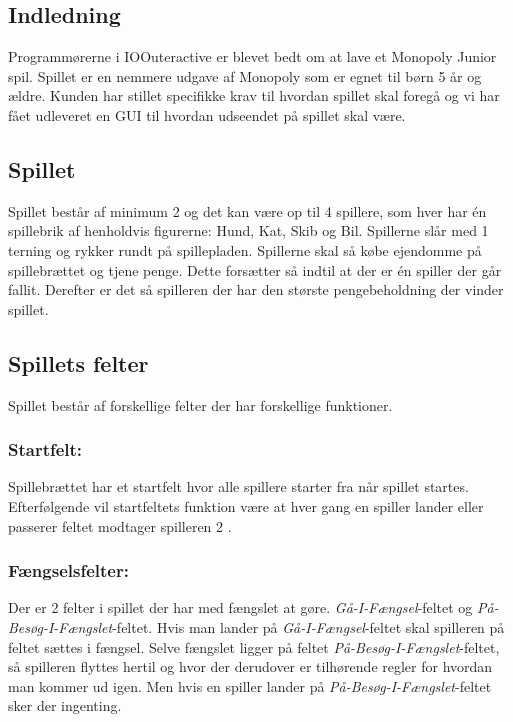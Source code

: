 \documentclass[../main.tex]{subfiles}
\begin{document}
\begin{flushleft}

\section{Indledning}
Programmørerne i IOOuteractive er blevet bedt om at lave et Monopoly Junior spil. Spillet er en nemmere udgave af Monopoly som er egnet til børn 5 år og ældre. Kunden har stillet specifikke krav til hvordan spillet skal foregå og vi har fået udleveret en GUI til hvordan udseendet på spillet skal være.\\

\subsection{Spillet}
Spillet består af minimum 2 og det kan være op til 4 spillere, som hver har én spillebrik af henholdvis figurerne: Hund, Kat, Skib og Bil. Spillerne slår med 1 terning og rykker rundt på spillepladen. Spillerne skal så købe ejendomme på spillebrættet og tjene \M penge. Dette forsætter så indtil at der er én spiller der går fallit. Derefter er det så spilleren der har den største pengebeholdning der vinder spillet.\\

\subsection{Spillets felter}
Spillet består af forskellige felter der har forskellige funktioner.\\

\subsubsection*{Startfelt:}
Spillebrættet har et startfelt hvor alle spillere starter fra når spillet startes. Efterfølgende vil startfeltets funktion være at hver gang en spiller lander eller passerer feltet modtager spilleren 2 \M.

\subsubsection*{Fængselsfelter:}
Der er 2 felter i spillet der har med fængslet at gøre. \textit{Gå-I-Fængsel}-feltet og \textit{På-Besøg-I-Fængslet}-feltet. Hvis man lander på \textit{Gå-I-Fængsel}-feltet skal spilleren på feltet sættes i fængsel. Selve fængslet ligger på feltet \textit{På-Besøg-I-Fængslet}-feltet, så spilleren flyttes hertil og hvor der derudover er tilhørende regler for hvordan man kommer ud igen. Men hvis en spiller lander på \textit{På-Besøg-I-Fængslet}-feltet sker der ingenting.\\


\end{flushleft}
\end{document}
